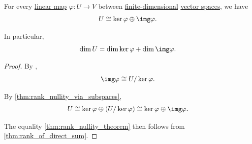 \begin{theorem}\label{thm:rank_nullity_theorem}
  For every \hyperref[def:linear_function]{linear map} \( \varphi: U \to V \) between \hyperref[thm:vector_space_dimension]{finite-dimensional} \hyperref[def:vector_space]{vector spaces}, we have
  \begin{equation}\label{eq:thm:rank_nullity_theorem}
    U \cong \ker \varphi \oplus \img \varphi.
  \end{equation}

  In particular,
  \begin{equation}\label{eq:thm:rank_nullity_theorem/dim}
    \dim U = \dim \ker \varphi + \dim \img \varphi.
  \end{equation}
\end{theorem}
\begin{proof}
  By ,
  \begin{equation*}
    \img \varphi \cong U / \ker \varphi.
  \end{equation*}

  By \cref{thm:rank_nullity_via_subspaces},
  \begin{equation*}
    U \cong \ker \varphi \oplus (U / \ker \varphi) \cong \ker \varphi \oplus \img \varphi.
  \end{equation*}

  The equality \eqref{thm:rank_nullity_theorem} then follows from \cref{thm:rank_of_direct_sum}.
\end{proof}
